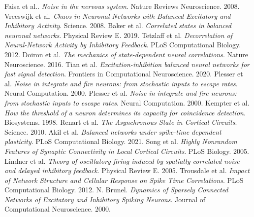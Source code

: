 \documentclass{ucetd}
\begin{document}
\newline
\noindent [14] Faisa et al.. \textit{Noise in the nervous system}. Nature Reviews Neuroscience. 2008.
\newline
\noindent [15] Vreeswijk et al. \textit{Chaos in Neuronal Networks with Balanced Excitatory and Inhibitory Activity}. Science. 2008.
\newline
\noindent [16] Baker et al. \textit{Correlated states in balanced neuronal networks}. Physical Review E. 2019.
\newline
\noindent [17] Tetzlaff et al. \textit{Decorrelation of Neural-Network Activity by Inhibitory Feedback}. PLoS Computational Biology. 2012.
\newline
\noindent [18] Doiron et al. \textit{The mechanics of state-dependent neural correlations}. Nature Neuroscience. 2016.
\newline
\noindent [19] Tian et al. \textit{Excitation-inhibition balanced neural networks for fast signal detection}. Frontiers in Computational Neuroscience. 2020.
\newline
\noindent [20] Plesser et al. \textit{Noise in integrate and fire neurons: from stochastic inputs to escape rates}. Neural Computation. 2000.
\newline
\noindent [21] Plesser et al. \textit{Noise in integrate and fire neurons: from stochastic inputs to escape rates}. Neural Computation. 2000.
\newline
\noindent [22] Kempter et al. \textit{How the threshold of a neuron determines its capacity for coincidence detection}. Biosystems. 1998.
\newline
\noindent [23] Renart et al. \textit{The Asynchronous State in Cortical Circuits}. Science. 2010.
\newline
\noindent [24] Akil et al. \textit{Balanced networks under spike-time dependent plasticity}. PLoS Computational Biology. 2021.
\newline
\noindent [25] Song et al. \textit{Highly Nonrandom Features of Synaptic Connectivity in Local Cortical Circuits}. PLoS Biology. 2005.
\newline
\noindent [26] Lindner et al. \textit{Theory of oscillatory firing induced by spatially correlated noise and delayed inhibitory feedback}. Physical Review E. 2005.
\newline
\noindent [27] Trousdale et al. \textit{Impact of Network Structure and Cellular Response on Spike Time Correlations}. PLoS Computational Biology. 2012.
\newline
\noindent [28] N. Brunel. \textit{Dynamics of Sparsely Connected Networks of Excitatory and Inhibitory Spiking Neurons}. Journal of Computational Neuroscience. 2000.
\end{document}
